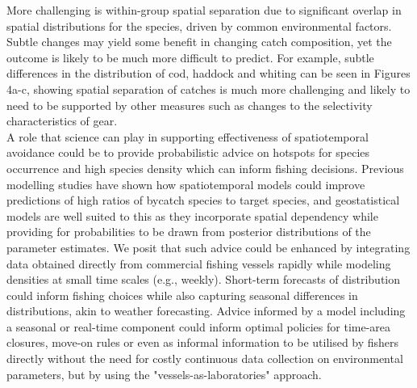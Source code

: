 \documentclass[fleqn,10pt]{wlscirep}
\begin{document}
\begin{linenumbers}
More challenging is within-group spatial separation due to significant overlap
in spatial distributions for the species, driven by common environmental
factors. Subtle changes may yield some benefit in changing catch composition,
yet the outcome is likely to be much more difficult to predict. For example,
subtle differences in the distribution of cod, haddock and whiting can be seen
in Figures 4a-c, showing spatial separation of catches is much more challenging
and likely to need to be supported by other measures such as changes to the
selectivity characteristics of gear\cite{Santos2016}. \\

A role that science can play in supporting effectiveness of spatiotemporal
avoidance could be to provide probabilistic advice on hotspots for species
occurrence and high species density which can inform fishing decisions.
Previous modelling studies have shown how spatiotemporal models could improve
predictions of high ratios of bycatch species to target species\cite{Ward2015,
	Cosandey-Godin2015, Breivik2016}, and geostatistical models are well
suited to this as they incorporate spatial dependency while providing for
probabilities to be drawn from posterior distributions of the parameter
estimates. We posit that such advice  could be enhanced by integrating data obtained directly from
commercial fishing vessels rapidly while modeling densities at small time
scales (e.g., weekly).  Short-term forecasts of distribution could inform
fishing choices while also capturing seasonal differences in distributions,
akin to weather forecasting.  Advice informed by a model including a seasonal
or real-time component could inform optimal policies for time-area closures,
move-on rules or even as informal information to be utilised by fishers
directly without the need for costly continuous data collection on
environmental parameters, but by using the "vessels-as-laboratories"
approach.\\


\end{linenumbers}
\end{document}
